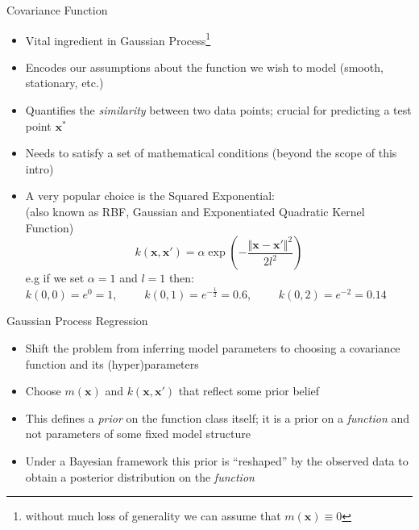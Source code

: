 \documentclass[pdf]{beamer}
\begin{document}
\begin{frame}{Covariance Function}
\begin{itemize}\addtolength{\itemsep}{0.2\baselineskip}
	\item<1-> Vital ingredient in Gaussian Process\footnote{without much loss of generality we can assume that $m(\mathbf{x}) \equiv 0$} 
	\item<2-> Encodes our assumptions about the function we wish to model (smooth, stationary, etc.)
	\item<3-> Quantifies the \textit{similarity} between two data points; crucial for predicting a test point $\mathbf{x^*}$
	\item<4-> Needs to satisfy a set of mathematical conditions {\tiny (beyond the scope of this intro)}
	\item<5-> A very popular choice is the Squared Exponential:\\ 
	{\tiny (also known as RBF, Gaussian and Exponentiated Quadratic Kernel Function)} 
	$$
	k(\mathbf{x},\mathbf{x}') = \alpha \exp \left( - {\frac{\Vert \mathbf{x} - \mathbf{x'} \Vert^2}{2l^2}} \right)
	$$
	e.g if we set $\alpha=1$ and $l=1$ then:\\
 	{\footnotesize $k(0, 0) = e^0 = 1$,\ \ \ \ \ $k(0, 1) = e^{-\frac{1}{2}} = 0.6$,\ \ \ \ \ $k(0, 2) = e^{-2} = 0.14$}
\end{itemize}
\end{frame}

\begin{frame}{Gaussian Process Regression}
\begin{itemize}\addtolength{\itemsep}{1\baselineskip}
	\item<1-> Shift the problem from inferring model parameters to choosing a covariance function and its (hyper)parameters
	\item<2-> Choose $m(\mathbf{x})$ and $k(\mathbf{x},\mathbf{x}')$ that reflect some prior belief
	\item<3-> This defines a \textit{prior} on the function class itself; it is a prior on a \textit{function} and not 
	parameters of some fixed model structure
	\item<4-> Under a Bayesian framework this prior is ``reshaped'' by the observed data to obtain a posterior distribution
	on the \textit{function}
\end{itemize}
\end{frame}
\end{document}

